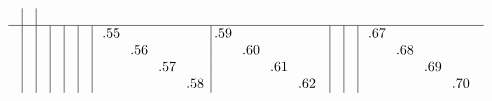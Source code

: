 \documentclass[12pt,a4paper,landscape]{amsart}
\begin{document}
\begin{align*}
\begin{array}{c|c|c|c|c|c|c|c|c|c}
\begin{array}{rr}
\end{array}%
&\\\hline
&&&&&&
\begin{array}{rrrr|rrrr}%
\llap.55&  &  &  &\llap.59&  &  &  \\%
  &\llap.56&  &  &  &\llap.60&  &  \\%
  &  &\llap.57&  &  &  &\llap.61&  \\%
  &  &  &\llap.58&  &  &  &\llap.62\\%
\end{array}%
&&&
\begin{array}{rrrr}%
\llap.67&  &  &  \\%
  &\llap.68&  &  \\%
  &  &\llap.69&  \\%
  &  &  &\llap.70\\%
\end{array}%
  \end{array}
\end{align*}
\end{document}
